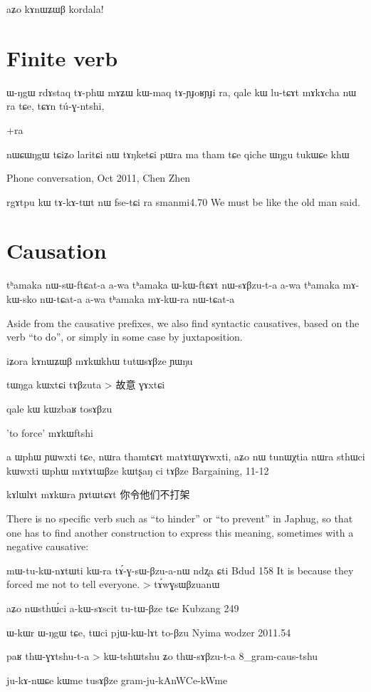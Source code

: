 \documentclass[oldfontcommands,oneside,a4paper,11pt]{memoir}
\newcommand{\wav}[1]{}%
\begin{document}
aʑo kɤnɯʑɯβ kordala!
\section{Finite verb}
ɯ-ŋgɯ	rdɤstaq	tɤ-phɯ	mɤʑɯ	kɯ-maq	tɤ-ɲɟoʁɲɟi	ra,	qale	kɯ	lu-tɕɤt	mɤkɤcha	nɯ	ra	tɕe,	tɕɤn	tú-ɣ-ntshi,

+ra

nɯɕɯŋgɯ tɕiʑo laritɕi nɯ tɤŋketɕi pɯra ma tham tɕe qiche ɯŋgu tukɯɕe khɯ
\wav{8_tANketCipWra}
Phone conversation, Oct 2011, Chen Zhen


rgɤtpu kɯ tɤ-kɤ-tɯt nɯ fse-tɕi ra
smanmi4.70
We must be like the old man said.
\section{Causation} \label{sec:causation.complement}

tʰamaka nɯ-sɯ-ftɕat-a
a-wa tʰamaka ɯ-kɯ-ftɕɤt nɯ-sɤβzu-t-a
a-wa tʰamaka mɤ-kɯ-sko nɯ-tɕat-a
a-wa tʰamaka mɤ-kɯ-ra nɯ-tɕat-a
\wav{8_causatifs_complexes}

Aside from the causative prefixes, we also find syntactic causatives, based on the verb  ``to do'', or simply in some case by juxtaposition.

 iʑora kɤnɯʑɯβ mɤkɯkhɯ tutɯsɤβze ɲɯŋu

tɯŋga kɯxtɕi tɤβzuta > 故意 ɣɤxtɕi
 

qale kɯ kɯzbaʁ tosɤβzu

'to force' mɤkɯftshi

a ɯphɯ ɲɯwxti tɕe, nɯra thamtɕɤt matɤtɯɣɤwxti, aʑo nɯ tunɯχtia
nɯra sthɯci kɯwxti ɯphɯ mɤtɤtɯβze kɯtʂaŋ ci tɤβze
Bargaining, 11-12


kɤlɯlɤt mɤkɯra ɲɤtɯtɕɤt \wav{mAkWra}
你令他们不打架


There is no specific verb such as ``to hinder'' or ``to prevent'' in Japhug, so that one has to find another construction to express this meaning, sometimes with a negative causative:



mɯ-tu-kɯ-nɤtɯti	kɯ-ra	tɤ́-ɣ-sɯ-βzu-a-nɯ	ndʐa	ɕti
Bdud 158 
It is because they forced me not to tell everyone. > tɤ́wɣsɯβzuanɯ


aʑo	nɯsthɯ́ci	a-kɯ-sɤscit	tu-tɯ-βze	tɕe
Kubzang 249

ɯ-kɯr ɯ-ŋgɯ tɕe, tɯci pjɯ-kɯ-lɤt to-βzu
Nyima wodzer 2011.54


paʁ thɯ-ɣɤtshu-t-a > kɯ-tshɯtshu ʑo thɯ-sɤβzu-t-a
8_gram-caus-tshu

ju-kɤ-nɯɕe kɯme tusɤβze
gram-ju-kAnWCe-kWme
\end{document}
